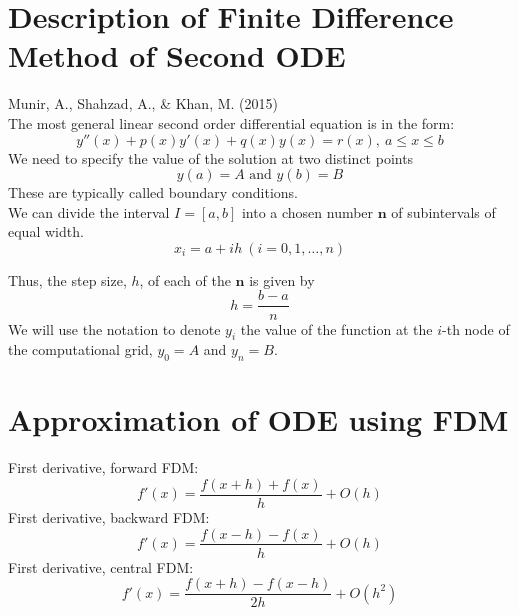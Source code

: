 \documentclass[12pt]{report}
\newcommand{\sps}{\\[0.2cm]}
\newcommand{\sprime}{'}
\newcommand{\dprime}{''}
\begin{document}
	
	\section{Description of Finite Difference Method of Second ODE}
	Munir, A., Shahzad, A., \& Khan, M. (2015)\\
	The most general linear second order differential equation is in the form:
	\begin{equation}
		y\dprime(x) + p(x)y\sprime(x) + q(x)y(x) = r(x), ~ a \leq x \leq b \label{eq:3_1}
	\end{equation}
	We need to specify the value of the solution at two distinct points
	\begin{equation*}
		y(a) = A \text{ and } y(b) = B
	\end{equation*}
	These are typically called boundary conditions.\sps
	We can divide the interval $I=[a,b]$ into a chosen number $\mathbf{n}$ of subintervals of equal width.
	\begin{equation*}
		x_i = a + ih~(i=0,1,\ldots, n)
	\end{equation*}
	\begin{center}
	\end{center}
	Thus, the step size, $h$, of each of the $\mathbf{n}$ is given by
	\begin{equation*}
		h = \frac{b-a}{n}
	\end{equation*}
	We will use the notation to denote $y_i$ the value of the function at the $i$-th node of the computational grid, $y_0 = A$ and $y_n = B$.\sps
	
	\section{Approximation of ODE using FDM}
	First derivative, forward FDM:
	\begin{equation}
		f\sprime(x) = \frac{f(x+h) + f(x)}{h} + O(h) \label{eq:3_2}
	\end{equation}
	First derivative, backward FDM:
	\begin{equation}
		f\sprime(x) = \frac{f(x-h) - f(x)}{h} + O(h) \label{eq:3_3}
	\end{equation}
	First derivative, central FDM:
	\begin{equation}
		f\sprime(x) = \frac{f(x+h) - f(x-h)}{2h} + O(h^2)\label{eq:3_4}
	\end{equation}
\end{document}
